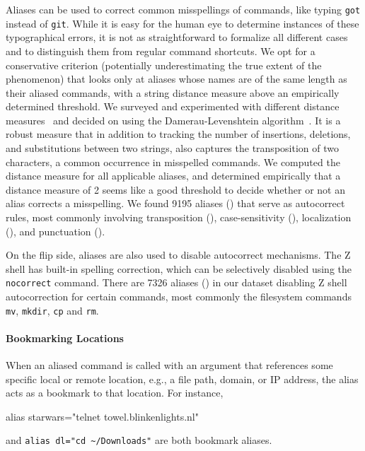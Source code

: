 Aliases can be used to correct common misspellings of commands, like typing \verb|got| instead of \verb|git|.
While it is easy for the human eye to determine instances of these typographical errors, it is not as straightforward to formalize all different cases and to distinguish them from regular command shortcuts.
We opt for a conservative criterion (potentially underestimating the true extent of the phenomenon) that looks only at aliases whose names are of the same length as their aliased commands, with a string distance measure above an empirically determined threshold.
We surveyed and experimented with different distance measures~\cite{navarro:01} and decided on using the Damerau-Levenshtein algorithm~\cite{damerau:64}.
It is a robust measure that in addition to tracking the number of insertions, deletions, and substitutions between two strings, also captures the transposition of two characters, a common occurrence in misspelled commands.
We computed the distance measure for all applicable aliases, and determined empirically that a distance measure of 2 seems like a good threshold to decide whether or not an alias corrects a misspelling.
We found \num{9195} aliases () that serve as autocorrect rules, most commonly involving transposition (), case-sensitivity (), localization (), and punctuation ().

On the flip side, aliases are also used to disable autocorrect mechanisms.
The Z shell has built-in spelling correction, which can be selectively disabled using the \verb|nocorrect| command.
There are \num{7326} aliases () in our dataset disabling Z shell autocorrection for certain commands, most commonly the filesystem commands \verb|mv|, \verb|mkdir|, \verb|cp| and \verb|rm|.

\paragraph{\bf Bookmarking Locations}

When an aliased command is called with an argument that references some specific local or remote location, e.g., a file path, domain, or IP address, the alias acts as a bookmark to that location.
For instance,
\begin{CVerbatim}
alias starwars="telnet towel.blinkenlights.nl"    
\end{CVerbatim}
and \verb|alias dl="cd ~/Downloads"|
are both bookmark aliases.

